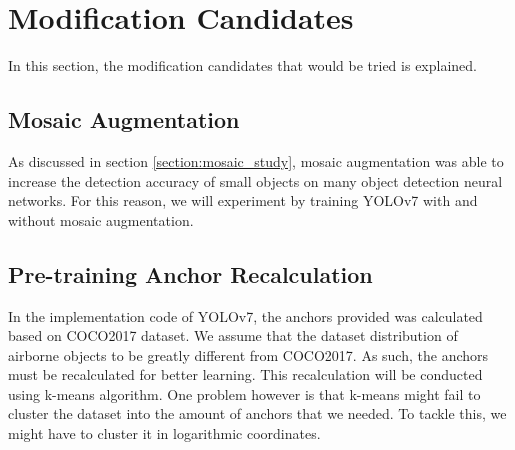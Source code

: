 \section{Modification Candidates}
\label{section:modificationcandidates}
In this section, the modification candidates that would be tried is explained.
  \subsection{Mosaic Augmentation}
  As discussed in section \ref{section:mosaic_study}, mosaic augmentation was able to increase the detection accuracy of small objects
  on many object detection neural networks. For this reason, we will experiment by training YOLOv7 with and without  mosaic augmentation.
  \subsection{Pre-training Anchor Recalculation}

  In the implementation code of YOLOv7, the anchors provided was calculated based on COCO2017 dataset.
  We assume that the dataset distribution of airborne objects to be greatly different from COCO2017.
  As such, the anchors must be recalculated for better learning. This recalculation will be conducted
  using k-means algorithm. One problem however is that k-means might fail to cluster the dataset into 
  the amount of anchors that we needed. To tackle this, we might have to cluster it in logarithmic coordinates. 

